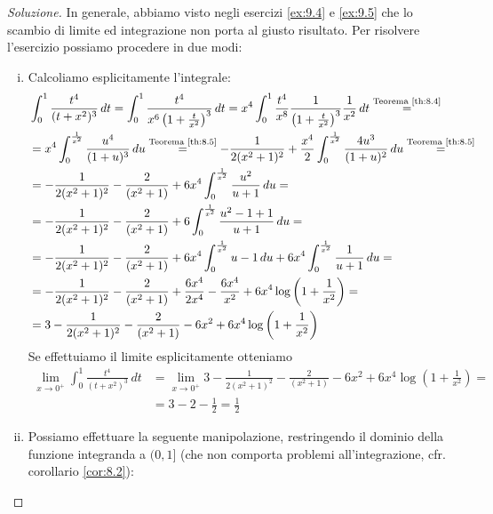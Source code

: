 \begin{proof}[Soluzione]
    In generale, abbiamo visto negli esercizi \ref{ex:9.4} e \ref{ex:9.5} che lo scambio di limite ed integrazione non porta al giusto risultato. Per risolvere l'esercizio possiamo procedere in due modi:
    \begin{enumerate}[(i)]
        \item Calcoliamo esplicitamente l'integrale:
        \[
        \begin{split}
            &\int_0^1 \frac{t^4}{(t+x^2)^3}\, dt = \int_0^1 \frac{t^4}{x^6\left(1+\frac{t}{x^2}\right)^3}\, dt = x^4\int_0^1\frac{t^4}{x^8}\frac{1}{\left(1+\frac{t}{x^2}\right)^3} \frac{1}{x^2}\, dt \overset{\text{Teorema \ref{th:8.4}}}{=} \\
            & = x^4\int_0^{\frac{1}{x^2}} \frac{u^4}{(1+u)^3}\, du \overset{\text{Teorema \ref{th:8.5}}}{=} -\frac{1}{2(x^2+1)^2} +\frac{x^4}{2}\int_0^{\frac{1}{x^2}}\frac{4u^3}{(1+u)^2}\, du \overset{\text{Teorema \ref{th:8.5}}}{=}\\
            & = -\frac{1}{2(x^2+1)^2}-\frac{2}{(x^2+1)}+6x^4\int_0^{\frac{1}{x^2}}\frac{u^2}{u+1}\, du = \\
            & = -\frac{1}{2(x^2+1)^2}-\frac{2}{(x^2+1)}+6\int_0^{\frac{1}{x^2}}\frac{u^2-1+1}{u+1}\, du = \\
            & = -\frac{1}{2(x^2+1)^2}-\frac{2}{(x^2+1)}+6x^4\int_0^{\frac{1}{x^2}} u-1\, du + 6x^4 \int_0^{\frac{1}{x^2}} \frac{1}{u+1}\, du  = \\
            & = -\frac{1}{2(x^2+1)^2}-\frac{2}{(x^2+1)} + \frac{6x^4}{2x^4} - \frac{6x^4}{x^2} + 6x^4\log\left(1+\frac{1}{x^2}\right) = \\
            & = 3 -\frac{1}{2(x^2+1)^2}-\frac{2}{(x^2+1)} - 6{x^2} + 6x^4\log\left(1+\frac{1}{x^2}\right)
        \end{split}
        \]
        Se effettuiamo il limite esplicitamente otteniamo
        \[
        \begin{split}
            \lim_{x\to 0^+} \int_0^1 \frac{t^4}{(t+x^2)^3}\, dt &= \lim_{x\to 0^+} 3 -\frac{1}{2(x^2+1)^2}-\frac{2}{(x^2+1)} - 6{x^2} + 6x^4\log\left(1+\frac{1}{x^2}\right) = \\
            & = 3-2-\frac{1}{2} = \frac{1}{2}
        \end{split}
        \]
        \item Possiamo effettuare la seguente manipolazione, restringendo il dominio della funzione integranda a $(0,1]$ (che non comporta problemi all'integrazione, cfr. corollario \ref{cor:8.2}):

\end{enumerate}
\end{proof}
